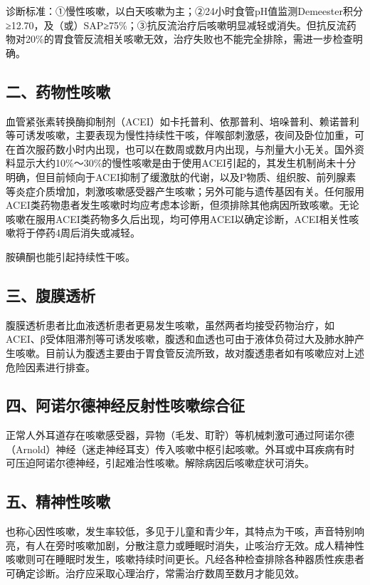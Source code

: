 诊断标准：①慢性咳嗽，以白天咳嗽为主；②24小时食管pH值监测Demeester积分≥12.70，及（或）SAP≥75\%；③抗反流治疗后咳嗽明显减轻或消失。但抗反流药物对20\%的胃食管反流相关咳嗽无效，治疗失败也不能完全排除，需进一步检查明确。

\subsection{二、药物性咳嗽}

血管紧张素转换酶抑制剂（ACEI）如卡托普利、依那普利、培哚普利、赖诺普利等可诱发咳嗽，主要表现为慢性持续性干咳，伴喉部刺激感，夜间及卧位加重，可在首次服药数小时内出现，也可以在数周或数月内出现，与剂量大小无关。国外资料显示大约10\%～30\%的慢性咳嗽是由于使用ACEI引起的，其发生机制尚未十分明确，但目前倾向于ACEI抑制了缓激肽的代谢，以及P物质、组织胺、前列腺素等炎症介质增加，刺激咳嗽感受器产生咳嗽；另外可能与遗传基因有关。任何服用ACEI类药物患者发生咳嗽时均应考虑本诊断，但须排除其他病因所致咳嗽。无论咳嗽在服用ACEI类药物多久后出现，均可停用ACEI以确定诊断，ACEI相关性咳嗽将于停药4周后消失或减轻。

胺碘酮也能引起持续性干咳。

\subsection{三、腹膜透析}

腹膜透析患者比血液透析患者更易发生咳嗽，虽然两者均接受药物治疗，如ACEI、β受体阻滞剂等可诱发咳嗽，腹透和血透也可由于液体负荷过大及肺水肿产生咳嗽。目前认为腹透主要由于胃食管反流所致，故对腹透患者如有咳嗽应对上述危险因素进行排查。

\subsection{四、阿诺尔德神经反射性咳嗽综合征}

正常人外耳道存在咳嗽感受器，异物（毛发、耵聍）等机械刺激可通过阿诺尔德（Arnold）神经（迷走神经耳支）传入咳嗽中枢引起咳嗽。外耳或中耳疾病有时可压迫阿诺尔德神经，引起难治性咳嗽。解除病因后咳嗽症状可消失。

\subsection{五、精神性咳嗽}

也称心因性咳嗽，发生率较低，多见于儿童和青少年，其特点为干咳，声音特别响亮，有人在旁时咳嗽加剧，分散注意力或睡眠时消失，止咳治疗无效。成人精神性咳嗽则可在睡眠时发生，咳嗽持续时间更长。凡经各种检查排除各种器质性疾患者可确定诊断。治疗应采取心理治疗，常需治疗数周至数月才能见效。

